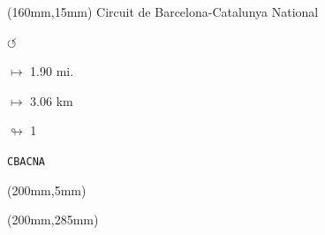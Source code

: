 \begin{textblock*}{40mm}(160mm,15mm)%
Circuit de Barcelona-Catalunya National
\par \Huge$\circlearrowleft$
\Large
\par$\mapsto$ 1.90 mi.
\par$\mapsto$ 3.06 km
\par$\looparrowright$ 1
\par\hfill\tiny\tt CBACNA\\
\end{textblock*}
\begin{textblock*}{20mm}(200mm,5mm)%
\fbox{\thepage}
\end{textblock*}
\begin{textblock*}{20mm}(200mm,285mm)%
\fbox{\thepage}
\end{textblock*}
\null\newpage

